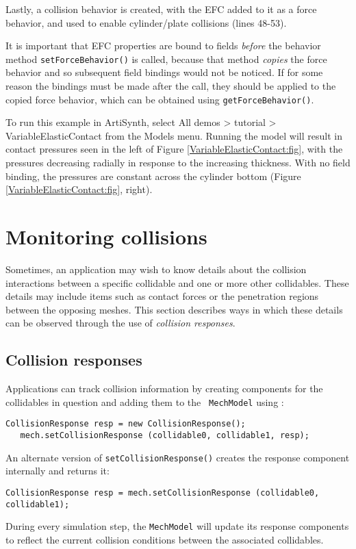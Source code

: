 Lastly, a collision behavior is created, with the EFC added to it as a
force behavior, and used to enable cylinder/plate collisions (lines
48-53).

\begin{sideblock}
It is important that EFC properties are bound to fields {\it before}
the behavior method {\tt setForceBehavior()} is called, because that
method {\it copies} the force behavior and so subsequent field
bindings would not be noticed. If for some reason the bindings must be
made after the call, they should be applied to the copied force
behavior, which can be obtained using {\tt getForceBehavior()}.
\end{sideblock}

To run this example in ArtiSynth, select {\sf All demos > tutorial >
VariableElasticContact} from the {\sf Models} menu. Running the model
will result in contact pressures seen in the left of
Figure \ref{VariableElasticContact:fig}, with the pressures decreasing
radially in response to the increasing thickness. With no field
binding, the pressures are constant across the cylinder bottom
(Figure \ref{VariableElasticContact:fig}, right).

\section{Monitoring collisions}
\label{MonitoringCollisions:sec}

Sometimes, an application may wish to know details about the collision
interactions between a specific collidable and one or more other
collidables.  These details may include items such as contact forces
or the penetration regions between the opposing meshes.  This section
describes ways in which these details can be observed through the use
of {\it collision responses}.

\subsection{Collision responses}
\label{collisionResponse:sec}

Applications can track collision information by
creating 
components for the collidables in question and adding them to the {\tt
MechModel} using 
:
%
\begin{lstlisting}[]
   CollisionResponse resp = new CollisionResponse();
   mech.setCollisionResponse (collidable0, collidable1, resp);
\end{lstlisting}
%
An alternate version of {\tt setCollisionResponse()} creates the
response component internally and returns it:
%
\begin{lstlisting}[]
   CollisionResponse resp = mech.setCollisionResponse (collidable0, collidable1);
\end{lstlisting}
%
During every simulation step, the {\tt MechModel} will update its
response components to reflect the current collision conditions
between the associated collidables.

